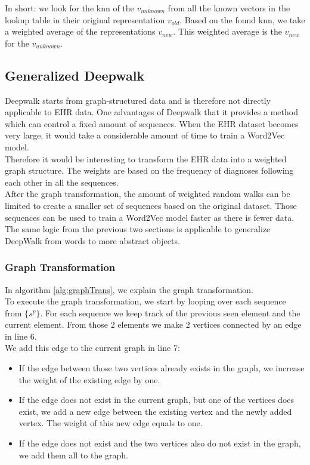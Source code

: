 In short: we look for the knn of the $v_{unknown}$ from all the known vectors in the lookup table in their original representation $v_{old}$. Based on the found knn, we take a weighted average of the representations $v_{new}$. This weighted average is the $v_{new}$ for the $v_{unknown}$.

\subsection{Generalized Deepwalk}

Deepwalk starts from graph-structured data and is therefore not directly applicable to EHR data. One advantages of Deepwalk that it provides a method which can control a fixed amount of sequences. When the EHR dataset becomes very large, it would take a considerable amount of time to train a Word2Vec model. \\

Therefore it would be interesting to transform the EHR data into a weighted graph structure. The weights are based on the frequency of diagnoses following each other in all the sequences. \\
After the graph transformation, the amount of weighted random walks can be limited to create a smaller set of sequences based on the original dataset. Those sequences can be used to train a Word2Vec model faster as there is fewer data. The same logic from the previous two sections is applicable to generalize DeepWalk from words to more abstract objects.

\subsubsection{Graph Transformation}

In algorithm \ref{alg:graphTrans}, we explain the graph transformation. \\
To execute the graph transformation, we start by looping over each sequence from $\{s^p\}$. For each sequence we keep track of the previous seen element and the current element. From those $2$ elements we make $2$ vertices connected by an edge in line 6. \\
We add this edge to the current graph in line 7:

\begin{itemize}

\item If the edge between those two vertices already exists in the graph, we increase the weight of the existing edge by one.

\item If the edge does not exist in the current graph, but one of the vertices does exist, we add a new edge between the existing vertex and the newly added vertex. The weight of this new edge equals to one.

\item If the edge does not exist and the two vertices also do not exist in the graph, we add them all to the graph.

\end{itemize}

